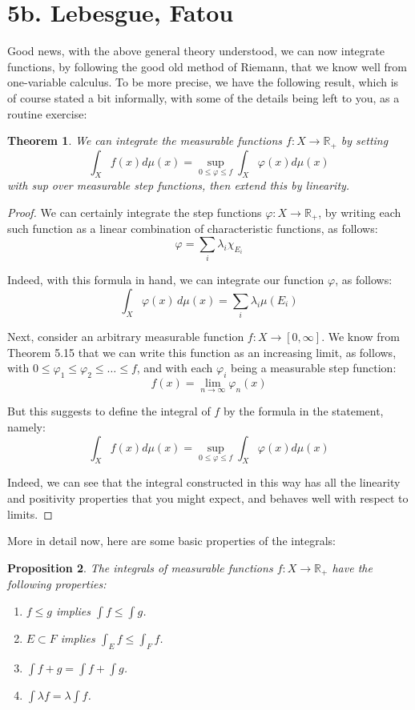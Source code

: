 \documentclass[12pt]{amsbook}
\newtheorem{theorem}{Theorem}[chapter]
\newtheorem{proposition}[theorem]{Proposition}
\begin{document}
\section*{5b. Lebesgue, Fatou}

Good news, with the above general theory understood, we can now integrate functions, by following the good old method of Riemann, that we know well from one-variable calculus. To be more precise, we have the following result, which is of course stated a bit informally, with some of the details being left to you, as a routine exercise:

\begin{theorem}
We can integrate the measurable functions $f:X\to\mathbb R_+$ by setting
$$\int_Xf(x)d\mu(x)=\sup_{0\leq\varphi\leq f}\int_X\varphi(x)d\mu(x)$$
with sup over measurable step functions, then extend this by linearity.
\end{theorem}

\begin{proof}
We can certainly integrate the step functions $\varphi:X\to\mathbb R_+$, by writing each such function as a linear combination of characteristic functions, as follows:
$$\varphi=\sum_i\lambda_i\chi_{E_i}$$

Indeed, with this formula in hand, we can integrate our function $\varphi$, as follows:
$$\int_X\varphi(x)\,d\mu(x)=\sum_i\lambda_i\mu(E_i)$$

Next, consider an arbitrary measurable function $f:X\to[0,\infty]$. We know from Theorem 5.15 that we can write this function as an increasing limit, as follows, with $0\leq\varphi_1\leq\varphi_2\leq\ldots\leq f$, and with each $\varphi_i$ being a measurable step function:
$$f(x)=\lim_{n\to\infty}\varphi_n(x)$$

But this suggests to define the integral of $f$ by the formula in the statement, namely:
$$\int_Xf(x)d\mu(x)=\sup_{0\leq\varphi\leq f}\int_X\varphi(x)d\mu(x)$$

Indeed, we can see that the integral constructed in this way has all the linearity and positivity properties that you might expect, and behaves well with respect to limits.
\end{proof}

More in detail now, here are some basic properties of the integrals:

\begin{proposition}
The integrals of measurable functions $f:X\to\mathbb R_+$ have the following properties:
\begin{enumerate}
\item $f\leq g$ implies $\int f\leq\int g$.

\item $E\subset F$ implies $\int_Ef\leq\int_Ff$.

\item $\int f+g=\int f+\int g$.

\item $\int\lambda f=\lambda\int f$.
\end{enumerate}
\end{proposition}
\end{document}
